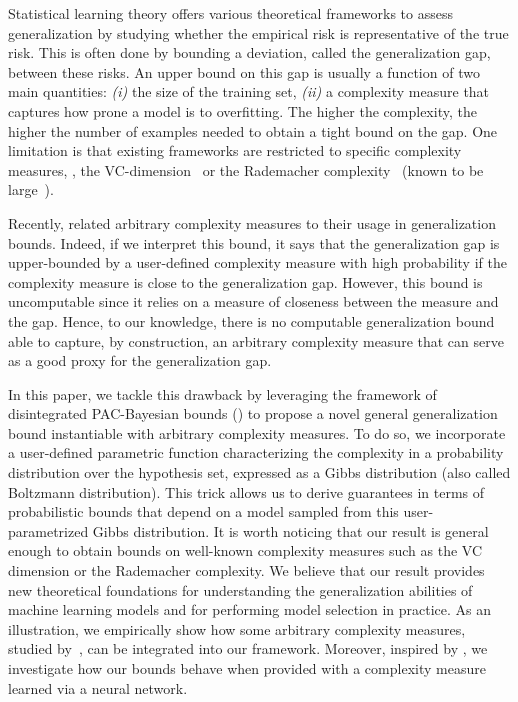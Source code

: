 \documentclass[twoside]{article}
\theoremstyle{plain}
\begin{document}
Statistical learning theory offers various theoretical frameworks to assess generalization by studying whether the empirical risk is representative of the true risk.
This is often done by bounding a deviation, called the generalization gap, between these risks.
An upper bound on this gap is usually a function of two main quantities: {\it (i)} the size of the training set, {\it (ii)} a complexity measure that captures how prone a model is to overfitting.
The higher the complexity, the higher the number of examples needed to obtain a tight bound on the gap.
One limitation is that existing frameworks are restricted to specific complexity measures, \eg, the VC-dimension~\citep{vapnik1971uniform} or the Rademacher complexity~\citep{bartlett2002rademacher} (known to be large~\citep{nagarajan2019uniform}). 

Recently, \citet[Proposition 1]{lee2020neural} related arbitrary complexity measures to their usage in generalization bounds.
Indeed, if we interpret this bound, it says that the generalization gap is upper-bounded by a user-defined complexity measure with high probability if the complexity measure is close to the generalization gap.
However, this bound is uncomputable since it relies on a measure of closeness between the measure and the gap.
Hence, to our knowledge, there is no computable generalization bound able to capture, by construction, an arbitrary complexity measure that can serve as a good proxy for the generalization gap.

In this paper, we tackle this drawback by leveraging the framework of disintegrated PAC-Bayesian bounds () to propose a novel general generalization bound instantiable with arbitrary complexity measures.
To do so, we incorporate a user-defined parametric function characterizing the complexity in a probability distribution over the hypothesis set, expressed as a Gibbs distribution (also called Boltzmann distribution). 
This trick allows us to derive guarantees in terms of probabilistic bounds that depend on a model sampled from this user-parametrized Gibbs distribution.
It is worth noticing that our result is general enough to obtain bounds on well-known complexity measures such as the VC dimension or the Rademacher complexity.
We believe that our result provides new theoretical foundations for understanding the generalization abilities of machine learning models and for performing model selection in practice.
As an illustration, we empirically show how some arbitrary complexity measures, studied by~\citet{jiang2020fantastic,dziugaite2020search,jiang2021methods}, can be integrated into our framework. 
Moreover, inspired by \citet{lee2020neural}, we investigate how our bounds behave when provided with a complexity measure learned via a neural network.
\end{document}
